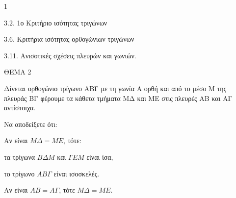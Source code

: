 \begin{ylh}{1}
    \item 3.2. 1ο Κριτήριο ισότητας τριγώνων
    \item 3.6. Κριτήρια ισότητας ορθογώνιων τριγώνων
    \item 3.11. Ανισοτικές σχέσεις πλευρών και γωνιών.
\end{ylh}

ΘΕΜΑ 2

Δίνεται ορθογώνιο τρίγωνο ΑΒΓ με τη γωνία Α ορθή και από το μέσο Μ της πλευράς ΒΓ φέρουμε τα κάθετα τμήματα ΜΔ και ΜΕ στις πλευρές ΑΒ και ΑΓ αντίστοιχα.

Να αποδείξετε ότι:

\begin{alist}
\item Αν είναι $M\Delta = ME$, τότε:
\begin{alist}
\item τα τρίγωνα $B\Delta M$ και $\Gamma EM$ είναι ίσα, 
\item το τρίγωνο $AB\Gamma$ είναι ισοσκελές. 
\end{alist}
\item Αν είναι $AB = A\Gamma$, τότε $M\Delta = ME$. 

\begin{center}
\end{center}
\end{alist}
